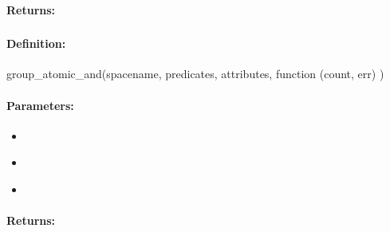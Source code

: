 \paragraph{Returns:}


\pagebreak
\subsubsection{}
\label{api:nodejs:group_atomic_and}


\paragraph{Definition:}
\begin{javascriptcode}
group_atomic_and(spacename, predicates, attributes, function (count, err) {})
\end{javascriptcode}
\paragraph{Parameters:}
\begin{itemize}[noitemsep]
\item {}\\

\item {}\\

\item {}\\

\end{itemize}

\paragraph{Returns:}


\pagebreak
\subsubsection{}
\label{api:nodejs:atomic_and}


